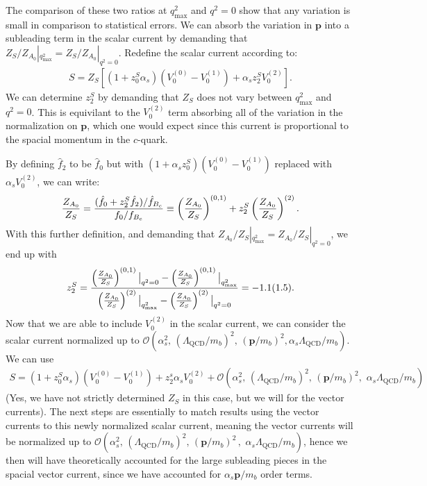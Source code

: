 The comparison of these two ratios at $q^2_{\text{max}}$ and $q^2=0$ show that any variation is small in comparison to statistical errors. We can absorb the variation in ${\textbf{p}}$ into a subleading term in the scalar current by demanding that $Z_{S}/Z_{A_0}|_{q^2_{\text{max}}} = Z_{S}/Z_{A_0}|_{q^2=0}$. Redefine the scalar current according to:
\begin{align}
 S = Z_{S} \left[ (1 + z^{S}_0 \alpha_s)( V_0^{(0)} - V_0^{(1)} ) + \alpha_s z^{S}_2 V_0^{(2)} \right].
\end{align}
We can determine $z_2^S$ by demanding that $Z_S$ does not vary between $q^2_{\text{max}}$ and $q^2=0$. This is equivilant to the $V_0^{(2)}$ term absorbing all of the variation in the normalization on ${\textbf{p}}$, which one would expect since this current is proportional to the spacial momentum in the $c$-quark.

By defining $\hat{f}_2$ to be $\hat{f}_0$ but with $(1+\alpha_s z_0^S)( V_0^{(0)} - V_0^{(1)} )$ replaced with $\alpha_s V_0^{(2)}$, we can write:
\begin{align}
	{Z_{A_0}\over Z_{S}} = { ( \hat{f}_0 + z^S_2 \hat{f}_2 )/ \hat{f}_{B_c}  \over f_0/f_{B_c} } \equiv \left({Z_{A_0}\over Z_{S}}\right)^{(0,1)} + z^S_2 \left({Z_{A_0}\over Z_{S}}\right)^{(2)}.
\end{align}
With this further definition, and demanding that ${Z_{A_0}/ Z_{S}}|_{q^2_{\text{max}}} = {Z_{A_0}/ Z_{S}}|_{q^2=0}$, we end up with
\begin{align}
	z^S_2 = { \left({Z_{A_0}\over Z_{S}}\right)^{(0,1)}\big\vert_{q^2=0} - \left({Z_{A_0}\over Z_{S}}\right)^{(0,1)}\big\vert_{q^2_{\text{max}}}
\over \left({Z_{A_0}\over Z_{S}}\right)^{(2)}\big\vert_{q^2_{\text{max}}} - \left({Z_{A_0}\over Z_{S}}\right)^{(2)}\big\vert_{q^2=0} }
 = -1.1(1.5).
\end{align}
Now that we are able to include $V_0^{(2)}$ in the scalar current, we can consider the scalar current normalized up to $\mathcal{O}(\alpha_s^2, \,(\Lambda_{\text{QCD}}/m_b)^2, \,({\textbf{p}}/m_b)^2, \alpha_s\Lambda_{\text{QCD}}/m_b )$. We can use
\begin{align}
  S = (1+z_0^S\alpha_s)( V_0^{(0)} - V_0^{(1)} ) + z_2^s\alpha_s V_0^{(2)} + \mathcal{O}(\alpha_s^2, \,(\Lambda_{\text{QCD}}/m_b)^2, \,({\textbf{p}}/m_b)^2,\,\, \alpha_s\Lambda_{\text{QCD}}/m_b )
\end{align}
(Yes, we have not strictly determined $Z_S$ in this case, but we will for the vector currents). The next steps are essentially to match results using the vector currents to this newly normalized scalar current, meaning the vector currents will be normalized up to $\mathcal{O}(\alpha_s^2, \,(\Lambda_{\text{QCD}}/m_b)^2, \,({\textbf{p}}/m_b)^2 \,,\,\, \alpha_s\Lambda_{\text{QCD}}/m_b)$, hence we then will have theoretically accounted for the large subleading pieces in the spacial vector current, since we have accounted for $\alpha_s{\textbf{p}}/m_b$ order terms.

